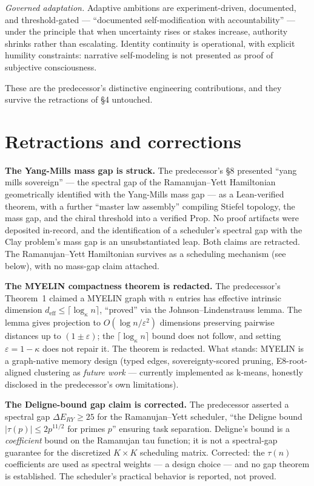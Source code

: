 \documentclass{alienfolio}
\begin{document}
\emph{Governed adaptation.} Adaptive ambitions are experiment-driven,
documented, and threshold-gated --- ``documented self-modification with
accountability'' --- under the principle that when uncertainty rises or
stakes increase, authority shrinks rather than escalating. Identity
continuity is operational, with explicit humility constraints: narrative
self-modeling is not presented as proof of subjective consciousness.

These are the predecessor's distinctive engineering contributions, and they
survive the retractions of \S4 untouched.

\section{Retractions and corrections}
\textbf{The Yang-Mills mass gap is struck.} The predecessor's \S8 presented
``yang mills sovereign'' --- the spectral gap of the Ramanujan--Yett
Hamiltonian geometrically identified with the Yang-Mills mass gap --- as a
Lean-verified theorem, with a further ``master law assembly'' compiling
Stiefel topology, the mass gap, and the chiral threshold into a verified
Prop. No proof artifacts were deposited in-record, and the identification of
a scheduler's spectral gap with the Clay problem's mass gap is an
unsubstantiated leap. Both claims are retracted. The Ramanujan--Yett
Hamiltonian survives as a scheduling mechanism (see below), with no mass-gap
claim attached.

\textbf{The MYELIN compactness theorem is redacted.} The predecessor's
Theorem~1 claimed a MYELIN graph with $n$ entries has effective intrinsic
dimension $d_{\mathrm{eff}} \leq \lceil \log_\kappa n \rceil$, ``proved'' via
the Johnson--Lindenstrauss lemma. The lemma gives projection to
$O(\log n / \varepsilon^2)$ dimensions preserving pairwise distances up to
$(1 \pm \varepsilon)$; the $\lceil \log_\kappa n \rceil$ bound does not
follow, and setting $\varepsilon = 1 - \kappa$ does not repair it. The
theorem is redacted. What stands: MYELIN is a graph-native memory design
(typed edges, sovereignty-scored pruning, E8-root-aligned clustering as
\emph{future work} --- currently implemented as k-means, honestly disclosed
in the predecessor's own limitations).

\textbf{The Deligne-bound gap claim is corrected.} The predecessor asserted a
spectral gap $\Delta E_{RY} \geq 25$ for the Ramanujan--Yett scheduler,
``the Deligne bound $|\tau(p)| \leq 2p^{11/2}$ for primes $p$'' ensuring
task separation. Deligne's bound is a \emph{coefficient} bound on the
Ramanujan tau function; it is not a spectral-gap guarantee for the
discretized $K \times K$ scheduling matrix. Corrected: the $\tau(n)$
coefficients are used as spectral weights --- a design choice --- and no gap
theorem is established. The scheduler's practical behavior is reported, not
proved.
\end{document}
